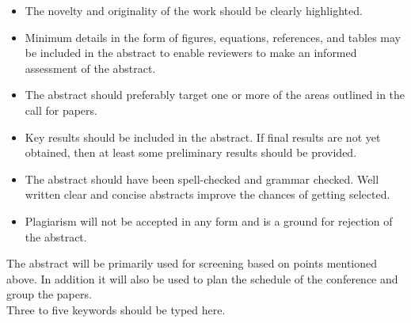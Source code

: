 \documentclass[a4paper,10pt]{article}
\begin{document}
\begin{itemize}
	\item The novelty and originality of the work should be clearly highlighted.
	\item Minimum details in the form of figures, equations, references, and tables may be included in the
	 abstract to enable reviewers to make an informed assessment of the abstract. 
	\item The abstract should preferably target one or more of the areas outlined in the call for papers.
	\item Key results should be included in the abstract. If final results are not yet obtained, then at least some preliminary results should be provided.
	\item The abstract should have been spell-checked and grammar checked. Well written clear and concise abstracts improve the chances of getting selected.
	\item Plagiarism will not be accepted in any form and is a ground for rejection of the abstract.
\end{itemize}
\noindent The abstract will be primarily used for screening based on points mentioned above. In addition it 
will also be used to plan the schedule of the conference and group the papers.\\

 Three to five keywords should be typed here.\\

\end{document}
